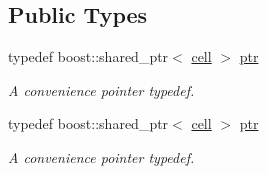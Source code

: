 \subsection*{Public Types}
\begin{DoxyCompactItemize}
\item 
typedef boost\-::shared\-\_\-ptr$<$ \hyperlink{structecto_1_1cell}{cell} $>$ \hyperlink{structecto_1_1cell_af2cab9d2bc012088c4f58c40da57a862}{ptr}
\begin{DoxyCompactList}\small\item\em A convenience pointer typedef. \end{DoxyCompactList}\item 
typedef boost\-::shared\-\_\-ptr$<$ \hyperlink{structecto_1_1cell}{cell} $>$ \hyperlink{structecto_1_1cell_af2cab9d2bc012088c4f58c40da57a862}{ptr}
\begin{DoxyCompactList}\small\item\em A convenience pointer typedef. \end{DoxyCompactList}\end{DoxyCompactItemize}
